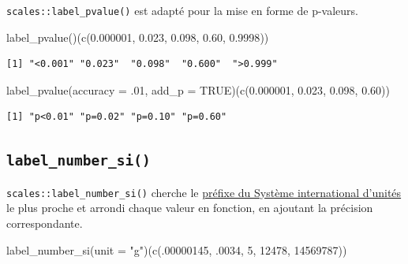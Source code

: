 \documentclass[
  letterpaper,
  DIV=11,
  numbers=noendperiod,
  oneside]{scrreprt}
\newenvironment{Shaded}{\begin{snugshade}}{\end{snugshade}}
\newcommand{\AttributeTok}[1]{\textcolor[rgb]{0.40,0.45,0.13}{#1}}
\newcommand{\ConstantTok}[1]{\textcolor[rgb]{0.56,0.35,0.01}{#1}}
\newcommand{\DecValTok}[1]{\textcolor[rgb]{0.68,0.00,0.00}{#1}}
\newcommand{\FloatTok}[1]{\textcolor[rgb]{0.68,0.00,0.00}{#1}}
\newcommand{\FunctionTok}[1]{\textcolor[rgb]{0.28,0.35,0.67}{#1}}
\newcommand{\NormalTok}[1]{\textcolor[rgb]{0.00,0.23,0.31}{#1}}
\newcommand{\StringTok}[1]{\textcolor[rgb]{0.13,0.47,0.30}{#1}}
\begin{document}
\texttt{scales::label\_pvalue()} est adapté pour la mise en forme de
p-valeurs.

\begin{Shaded}
\begin{Highlighting}[]
\FunctionTok{label\_pvalue}\NormalTok{()(}\FunctionTok{c}\NormalTok{(}\FloatTok{0.000001}\NormalTok{, }\FloatTok{0.023}\NormalTok{, }\FloatTok{0.098}\NormalTok{, }\FloatTok{0.60}\NormalTok{, }\FloatTok{0.9998}\NormalTok{))}
\end{Highlighting}
\end{Shaded}

\begin{verbatim}
[1] "<0.001" "0.023"  "0.098"  "0.600"  ">0.999"
\end{verbatim}

\begin{Shaded}
\begin{Highlighting}[]
\FunctionTok{label\_pvalue}\NormalTok{(}\AttributeTok{accuracy =}\NormalTok{ .}\DecValTok{01}\NormalTok{, }\AttributeTok{add\_p =} \ConstantTok{TRUE}\NormalTok{)(}\FunctionTok{c}\NormalTok{(}\FloatTok{0.000001}\NormalTok{, }\FloatTok{0.023}\NormalTok{, }\FloatTok{0.098}\NormalTok{, }\FloatTok{0.60}\NormalTok{))}
\end{Highlighting}
\end{Shaded}

\begin{verbatim}
[1] "p<0.01" "p=0.02" "p=0.10" "p=0.60"
\end{verbatim}

\hypertarget{label_number_si}{%
\subsection{\texorpdfstring{\texttt{label\_number\_si()}}{label\_number\_si()}}\label{label_number_si}}

\texttt{scales::label\_number\_si()} cherche le
\href{https://fr.wikipedia.org/wiki/Pr\%C3\%A9fixes_du_Syst\%C3\%A8me_international_d\%27unit\%C3\%A9s}{préfixe
du Système international d'unités} le plus proche et arrondi chaque
valeur en fonction, en ajoutant la précision correspondante.

\begin{Shaded}
\begin{Highlighting}[]
\FunctionTok{label\_number\_si}\NormalTok{(}\AttributeTok{unit =} \StringTok{"g"}\NormalTok{)(}\FunctionTok{c}\NormalTok{(.}\DecValTok{00000145}\NormalTok{, .}\DecValTok{0034}\NormalTok{, }\DecValTok{5}\NormalTok{, }\DecValTok{12478}\NormalTok{, }\DecValTok{14569787}\NormalTok{))}
\end{Highlighting}
\end{Shaded}
\end{document}
